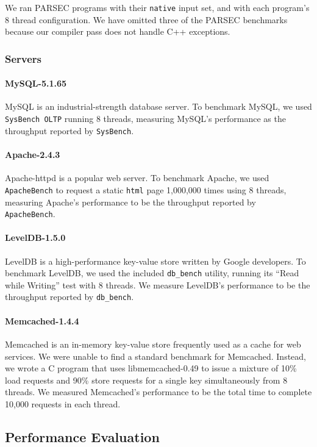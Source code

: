 \documentclass[10pt,nocopyrightspace]{sigplanconf}
\begin{document}
We ran PARSEC programs with their {\tt native} input set, and with each
program's 8 thread configuration. We have omitted three of the PARSEC
benchmarks because our compiler pass does not handle C++ exceptions.    

\subsubsection{Servers}


\paragraph{MySQL-5.1.65} MySQL is an industrial-strength database server. To
benchmark MySQL, we used {\tt SysBench OLTP} running 8 threads, measuring
MySQL's performance as the throughput reported by {\tt SysBench}.  

\paragraph{Apache-2.4.3} 
Apache-httpd is a popular web server.  To benchmark Apache, we used {\tt
ApacheBench} to request a static {\tt html} page 1,000,000 times using 8
threads, measuring Apache's performance to be the throughput reported by {\tt
ApacheBench}.  

\paragraph{LevelDB-1.5.0}
LevelDB is a high-performance key-value store written by Google
developers. To benchmark LevelDB, we used the included {\tt db\_bench} utility,
running its ``Read while Writing'' test with 8 threads.  We measure LevelDB's
performance to be the throughput reported by {\tt db\_bench}.

\paragraph{Memcached-1.4.4}
Memcached is an in-memory key-value store frequently used as a cache for web
services.  We were unable to find a standard benchmark for Memcached.  Instead,
we wrote a C program that uses libmemcached-0.49 to issue a
mixture of 10\% load requests and 90\% store requests for a single key 
simultaneously from 8 threads.  We measured Memcached's performance to be the
total time to complete 10,000 requests in each thread.



\subsection{Performance Evaluation}
\label{sec:eval:perf}
\end{document}
